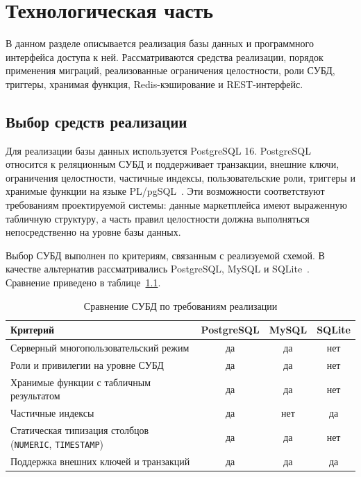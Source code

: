 
\chapter{Технологическая часть}

В данном разделе описывается реализация базы данных и программного интерфейса доступа к ней. Рассматриваются средства реализации, порядок применения миграций, реализованные ограничения целостности, роли СУБД, триггеры, хранимая функция, Redis-кэширование и REST-интерфейс.

\section{Выбор средств реализации}

Для реализации базы данных используется PostgreSQL 16. PostgreSQL относится к реляционным СУБД и поддерживает транзакции, внешние ключи, ограничения целостности, частичные индексы, пользовательские роли, триггеры и хранимые функции на языке PL/pgSQL~\cite{postgresql_doc}. Эти возможности соответствуют требованиям проектируемой системы: данные маркетплейса имеют выраженную табличную структуру, а часть правил целостности должна выполняться непосредственно на уровне базы данных.

Выбор СУБД выполнен по критериям, связанным с реализуемой схемой. В качестве альтернатив рассматривались PostgreSQL, MySQL и SQLite~\cite{postgresql_doc,mysql_doc,sqlite_doc}. Сравнение приведено в таблице~\ref{tbl:dbms_compare}.

\begin{table}[H]
    \caption{Сравнение СУБД по требованиям реализации}
    \label{tbl:dbms_compare}
    \begin{tabular}{|p{}|c|c|c|}
        \hline
        \textbf{Критерий} & \textbf{PostgreSQL} & \textbf{MySQL} & \textbf{SQLite} \\ \hline
        Серверный многопользовательский режим & да & да & нет \\ \hline
        Роли и привилегии на уровне СУБД & да & да & нет \\ \hline
        Хранимые функции с табличным результатом & да & да & нет \\ \hline
        Частичные индексы & да & нет & да \\ \hline
        Статическая типизация столбцов (\texttt{NUMERIC}, \texttt{TIMESTAMP}) & да & да & нет \\ \hline
        Поддержка внешних ключей и транзакций & да & да & да \\ \hline
    \end{tabular}
\end{table}

